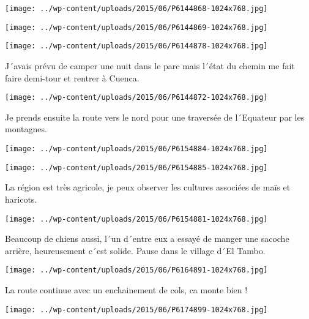  \newline
 \newline
\centerline{\texttt{[image: ../wp-content/uploads/2015/06/P6144868-1024x768.jpg]} } 
 \newline
 \newline
\centerline{\texttt{[image: ../wp-content/uploads/2015/06/P6144869-1024x768.jpg]} } 
 \newline
 \newline
\centerline{\texttt{[image: ../wp-content/uploads/2015/06/P6144878-1024x768.jpg]} } 
 \newline
 J´avais prévu de camper une nuit dans le parc mais l´état du chemin me fait faire demi-tour et rentrer à Cuenca. \newline
 \newline
\centerline{\texttt{[image: ../wp-content/uploads/2015/06/P6144872-1024x768.jpg]} } 
 \newline
 Je prends ensuite la route vers le nord pour une traversée de l´Equateur par les montagnes. \newline
 \newline
\centerline{\texttt{[image: ../wp-content/uploads/2015/06/P6154884-1024x768.jpg]} } 
 \newline
 \newline
\centerline{\texttt{[image: ../wp-content/uploads/2015/06/P6154885-1024x768.jpg]} } 
 \newline
 La région est très agricole, je peux observer les cultures associées de maïs et haricots. \newline
 \newline
\centerline{\texttt{[image: ../wp-content/uploads/2015/06/P6154881-1024x768.jpg]} } 
 \newline
 Beaucoup de chiens aussi, l´un d´entre eux a essayé de manger une sacoche arrière, heureusement c´est solide. \newline
 Pause dans le village d´El Tambo. \newline
 \newline
\centerline{\texttt{[image: ../wp-content/uploads/2015/06/P6164891-1024x768.jpg]} } 
 \newline
 La route continue avec un enchainement de cols, ca monte bien ! \newline
 \newline
\centerline{\texttt{[image: ../wp-content/uploads/2015/06/P6174899-1024x768.jpg]} } 
